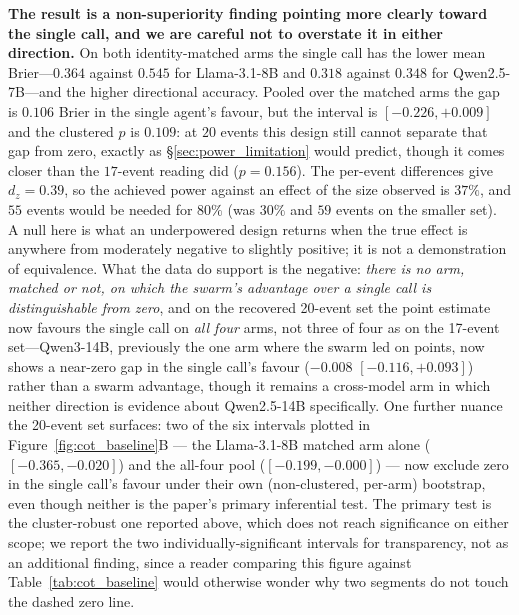 \documentclass[11pt,journal,onecolumn]{IEEEtran}
\begin{document}
\textbf{The result is a non-superiority finding pointing more clearly toward the single call, and we are careful not to overstate it in either direction.} On both identity-matched arms the single call has the lower mean Brier---$0.364$ against $0.545$ for Llama-3.1-8B and $0.318$ against $0.348$ for Qwen2.5-7B---and the higher directional accuracy. Pooled over the matched arms the gap is $0.106$ Brier in the single agent's favour, but the interval is $[-0.226, +0.009]$ and the clustered $p$ is $0.109$: at $20$ events this design still cannot separate that gap from zero, exactly as \S\ref{sec:power_limitation} would predict, though it comes closer than the $17$-event reading did ($p=0.156$). The per-event differences give $d_z = 0.39$, so the achieved power against an effect of the size observed is $37\%$, and $55$ events would be needed for $80\%$ (was $30\%$ and $59$ events on the smaller set). A null here is what an underpowered design returns when the true effect is anywhere from moderately negative to slightly positive; it is not a demonstration of equivalence. What the data do support is the negative: \emph{there is no arm, matched or not, on which the swarm's advantage over a single call is distinguishable from zero}, and on the recovered 20-event set the point estimate now favours the single call on \emph{all four} arms, not three of four as on the 17-event set---Qwen3-14B, previously the one arm where the swarm led on points, now shows a near-zero gap in the single call's favour ($-0.008$ $[-0.116,+0.093]$) rather than a swarm advantage, though it remains a cross-model arm in which neither direction is evidence about Qwen2.5-14B specifically. One further nuance the 20-event set surfaces: two of the six intervals plotted in Figure~\ref{fig:cot_baseline}B --- the Llama-3.1-8B matched arm alone ($[-0.365, -0.020]$) and the all-four pool ($[-0.199, -0.000]$) --- now exclude zero in the single call's favour under their own (non-clustered, per-arm) bootstrap, even though neither is the paper's primary inferential test. The primary test is the cluster-robust one reported above, which does not reach significance on either scope; we report the two individually-significant intervals for transparency, not as an additional finding, since a reader comparing this figure against Table~\ref{tab:cot_baseline} would otherwise wonder why two segments do not touch the dashed zero line.
\end{document}
